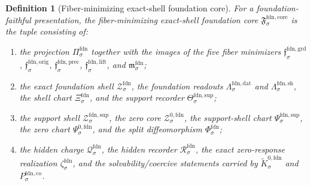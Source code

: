 \documentclass[11pt]{article}
\newcommand{\FoundProj}[1]{\Pi_{#1}^{\mathrm{fdn}}}
\newcommand{\FoundGroundMin}[1]{\mathfrak f_{#1}^{\mathrm{fdn,grd}}}
\newcommand{\FoundOrigMin}[1]{\mathfrak f_{#1}^{\mathrm{fdn,orig}}}
\newcommand{\FoundPrecMin}[1]{\mathfrak f_{#1}^{\mathrm{fdn,prec}}}
\newcommand{\FoundLiftMin}[1]{\mathfrak f_{#1}^{\mathrm{fdn,lift}}}
\newcommand{\FoundSubMin}[1]{\mathfrak m_{#1}^{\mathrm{fdn}}}
\newcommand{\FoundData}[1]{\Lambda_{#1}^{\mathrm{fdn,dat}}}
\newcommand{\FoundShellMap}[1]{\Lambda_{#1}^{\mathrm{fdn,sh}}}
\newcommand{\FoundShellSet}[1]{\mathcal Z_{#1}^{\mathrm{fdn}}}
\newcommand{\FoundChart}[1]{\Xi_{#1}^{\mathrm{fdn}}}
\newcommand{\FoundSupport}[1]{\Theta_{#1}^{\mathrm{fdn,sup}}}
\newcommand{\FoundSupportShell}[1]{\mathcal Z_{#1}^{\mathrm{fdn,sup}}}
\newcommand{\FoundZeroCore}[1]{\mathcal Z_{#1}^{0,\mathrm{fdn}}}
\newcommand{\FoundEqChart}[1]{\Psi_{#1}^{\mathrm{fdn,sup}}}
\newcommand{\FoundZeroChart}[1]{\Psi_{#1}^{0,\mathrm{fdn}}}
\newcommand{\FoundSplit}[1]{\Phi_{#1}^{\mathrm{fdn}}}
\newcommand{\FoundCharge}[1]{\mathcal Q_{#1}^{\mathrm{fdn}}}
\newcommand{\FoundResidual}[1]{\mathcal R_{#1}^{\mathrm{fdn}}}
\newcommand{\FoundEmbed}[1]{\zeta_{#1}^{\mathrm{fdn}}}
\newcommand{\FoundKernelCh}[1]{\widetilde K_{#1}^{0,\mathrm{fdn}}}
\newcommand{\FoundStateComp}[1]{P_{#1}^{\mathrm{fdn,co}}}
\newcommand{\FoundCore}[1]{\mathfrak F_{#1}^{\mathrm{fdn,core}}}
\newtheorem{definition}{Definition}
\begin{document}
\begin{definition}[Fiber-minimizing exact-shell foundation core]
\label{def:core}
For a foundation-faithful presentation, the \emph{fiber-minimizing exact-shell foundation core} \(\FoundCore{\sigma}\) is the tuple consisting of:
\begin{enumerate}
    \item the projection \(\FoundProj{\sigma}\) together with the images of the five fiber minimizers \(\FoundGroundMin{\sigma}\), \(\FoundOrigMin{\sigma}\), \(\FoundPrecMin{\sigma}\), \(\FoundLiftMin{\sigma}\), and \(\FoundSubMin{\sigma}\);
    \item the exact foundation shell \(\FoundShellSet{\sigma}\), the foundation readouts \(\FoundData{\sigma}\) and \(\FoundShellMap{\sigma}\), the shell chart \(\FoundChart{\sigma}\), and the support recorder \(\FoundSupport{\sigma}\);
    \item the support shell \(\FoundSupportShell{\sigma}\), the zero core \(\FoundZeroCore{\sigma}\), the support-shell chart \(\FoundEqChart{\sigma}\), the zero chart \(\FoundZeroChart{\sigma}\), and the split diffeomorphism \(\FoundSplit{\sigma}\);
    \item the hidden charge \(\FoundCharge{\sigma}\), the hidden recorder \(\FoundResidual{\sigma}\), the exact zero-response realization \(\FoundEmbed{\sigma}\), and the solvability/coercive statements carried by \(\FoundKernelCh{\sigma}\) and \(\FoundStateComp{\sigma}\).
\end{enumerate}
\end{definition}
\end{document}
